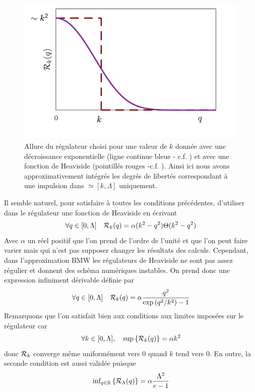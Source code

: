 \documentclass[10pt]{article}
\begin{document}
\begin{multicols}{2}
\begin{figure}[H]
\begin{center}
	\includegraphics[width=0.95\columnwidth]{Reg.pdf}
\end{center}
\vspace*{-22pt}
\caption{Allure du régulateur choisi pour une valeur de $k$ donnée avec une décroissance exponentielle (ligne continue bleue - c.f. ) et avec une fonction de Heaviside (pointillés rouges -c.f. ). Ainsi ici nous avons approximativement intégrés les degrés de libertés correspondant à une impulsion dans $\simeq [k,\Lambda]$ uniquement.}
\end{figure}

Il semble naturel, pour satisfaire à toutes les conditions précédentes, d'utiliser dans le régulateur une fonction de Heaviside en écrivant 
\begin{equation}
	\forall q \in [0, \Lambda] \quad \mathcal{R}_k(q) = \alpha (k^2 - q^2) \Theta(k^2 - q^2)
	\label{eq:RegHeav}
\end{equation}
Avec $\alpha$ un réel positif que l'on prend de l'ordre de l'unité et que l'on peut faire varier mais qui n'est pas supposer changer les résultats des calculs. Cependant, dans l'approximation BMW les régulateurs de Heaviside ne sont pas assez régulier et donnent des schéma numériques instables. On prend donc une expression infiniment dérivable définie par
\begin{equation}
	\forall q \in [0, \Lambda] \quad \mathcal{R}_k(q) = \alpha \frac{q^2}{\exp{(q^2/k^2)}-1}
	\label{eq:RegExp}
\end{equation}
Remarquons que l'on satisfait bien aux conditions aux limites imposées sur le régulateur car 
\begin{equation}
	\forall k \in [0,\Lambda],  \quad \text{sup} \left\{ \mathcal{R}_k(q) \right\} = \alpha k^2
\end{equation}
donc $\mathcal{R}_k$ converge même uniformément vers 0 quand $k$ tend vers 0. En outre, la seconde condition est aussi validée puisque
\begin{equation}
	 \text{inf}_{q \in \mathbb{R}} \left\{ \mathcal{R}_\Lambda(q) \right\} = \alpha \frac{\Lambda^2}{e-1}
\end{equation}




\end{multicols}
\end{document}
